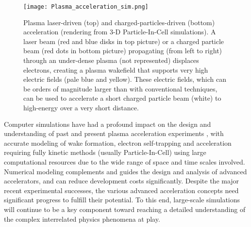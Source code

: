 \documentclass[]{report}
\begin{document}
\begin{figure}
\texttt{[image: Plasma\_acceleration\_sim.png]}

\caption{\label{fig:Plasma_acceleration_sim} Plasma laser-driven (top) and charged-particles-driven (bottom) acceleration (rendering from 3-D Particle-In-Cell simulations). A laser beam (red and blue disks in top picture) or a charged particle beam (red dots in bottom picture) propagating (from left to right) through an under-dense plasma (not represented) displaces electrons, creating a plasma wakefield that supports very high electric fields (pale blue and yellow). These electric fields, which can be orders of magnitude larger than with conventional techniques, can be used to accelerate a short charged particle beam (white) to high-energy over a very short distance.}
\end{figure}

Computer simulations have had a profound impact on the design and understanding of past and present plasma acceleration experiments \cite{Tsungpop06,Geddesjp08,Geddesscidac09,Huangscidac09}, with
accurate modeling of wake formation, electron self-trapping and acceleration requiring fully kinetic methods (usually Particle-In-Cell) using large computational resources due to the wide range of space and time scales involved. Numerical modeling complements and guides the design and analysis of advanced accelerators, and can reduce development costs significantly. Despite the major recent experimental successes\cite{LeemansPRL2014,Blumenfeld2007,BulanovSV2014,Steinke2016}, the various advanced acceleration concepts need significant progress to fulfill their potential.  To this end, large-scale simulations will continue to be a key component toward reaching a detailed understanding of the complex interrelated physics phenomena at play.
\end{document}
